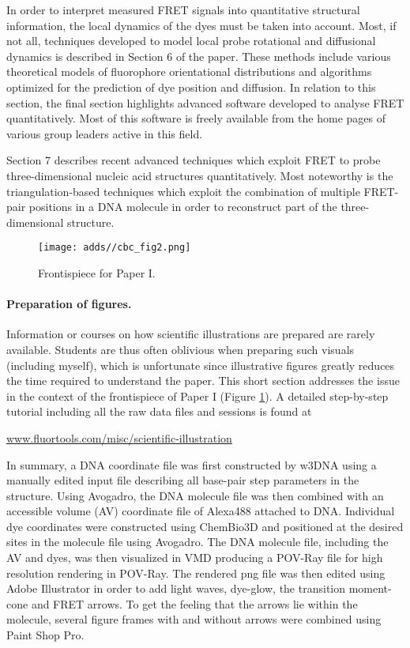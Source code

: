  In order to interpret measured FRET signals into quantitative structural information, the local dynamics of the dyes must be taken into account. Most, if not all, techniques developed to model local probe rotational and diffusional dynamics is described in Section 6 of the paper. These methods include various theoretical models of fluorophore orientational distributions and algorithms optimized for the prediction of dye position and diffusion. In relation to this section, the final section highlights advanced software developed to analyse FRET quantitatively. Most of this software is freely available from the home pages of various group leaders active in this field.

 Section 7 describes recent advanced techniques which exploit FRET to probe three-dimensional nucleic acid structures quantitatively. Most noteworthy is the triangulation-based techniques which exploit the combination of multiple FRET-pair positions in a DNA molecule in order to reconstruct part of the three-dimensional structure.\cite{Muschielok2008,Muschielok2011,Sabir2011,Sabir2012,Wozniak2008,Andrecka2008,Andrecka2009,Balci2011}

\begin{figure}
    \centering
        \texttt{[image: adds//cbc\_fig2.png]}
    \captionsetup{width=.95\textwidth}
    \caption{Frontispiece for Paper I.}
    \label{Fig:chap_Papers_CBC}
\end{figure}

 \paragraph{Preparation of figures.} Information or courses on how scientific illustrations are prepared are rarely available. Students are thus often oblivious when preparing such visuals (including myself), which is unfortunate since illustrative figures greatly reduces the time required to understand the paper. This short section addresses the issue in the context of the frontispiece of Paper I (Figure \ref{Fig:chap_Papers_CBC}). A detailed step-by-step tutorial including all the raw data files and sessions is found at

 \url{www.fluortools.com/misc/scientific-illustration}

 In summary, a DNA coordinate file was first constructed by w3DNA\cite{Zheng2009} using a manually edited input file describing all base-pair step parameters in the structure. Using Avogadro\cite{Hanwell2012}, the DNA molecule file was then combined with an accessible volume (AV) coordinate file of Alexa488 attached to DNA. Individual dye coordinates were constructed using ChemBio3D\cite{ChemBio3D} and positioned at the desired sites in the molecule file using Avogadro. The DNA molecule file, including the AV and dyes, was then visualized in VMD\cite{VMD} producing a POV-Ray file for high resolution rendering in POV-Ray\cite{POVray}. The rendered png file was then edited using Adobe Illustrator in order to add light waves, dye-glow, the transition moment-cone and FRET arrows. To get the feeling that the arrows lie within the molecule, several figure frames with and without arrows were combined using Paint Shop Pro.

